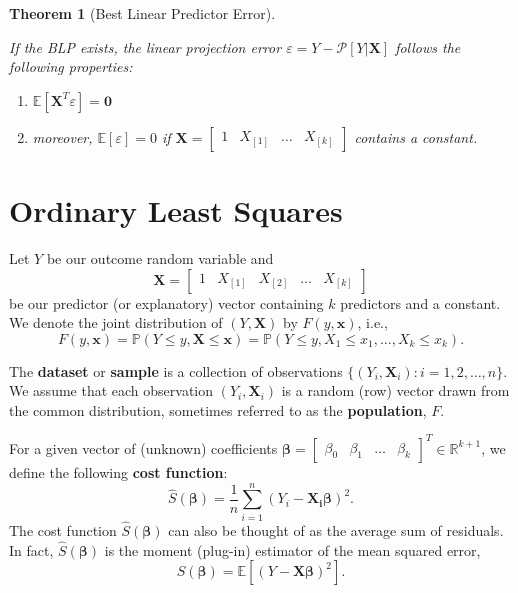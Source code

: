 \documentclass[
]{book}
\providecommand{\tightlist}{%
  \setlength{\itemsep}{0pt}\setlength{\parskip}{0pt}}
\newtheorem{theorem}{Theorem}[chapter]
\theoremstyle{definition}
\theoremstyle{definition}
\theoremstyle{definition}
\theoremstyle{definition}
\theoremstyle{remark}
\begin{document}
\begin{theorem}[Best Linear Predictor Error]
\protect\hypertarget{thm:blperror}{}\label{thm:blperror}

If the BLP exists, the linear projection error \(\varepsilon=Y-\mathscr{P}[Y|{\boldsymbol{X}}]\) follows the following properties:

\begin{enumerate}
\def\labelenumi{\arabic{enumi}.}
\tightlist
\item
  \({\mathbb{E}}[{\boldsymbol{X}}^T\varepsilon]={\boldsymbol{0}}\)
\item
  moreover, \({\mathbb{E}}[\varepsilon]=0\) if
  \({\boldsymbol{X}}=\begin{bmatrix}1 & X_{[1]} & \ldots & X_{[k]} \end{bmatrix}\) contains a constant.
\end{enumerate}

\end{theorem}

\hypertarget{ordinary-least-squares}{%
\chapter{Ordinary Least Squares}\label{ordinary-least-squares}}

Let \(Y\) be our outcome random variable and
\[
{\boldsymbol{X}}=\begin{bmatrix}
1 & X_{[1]} & X_{[2]} & \ldots & X_{[k]}
\end{bmatrix}
\]
be our predictor (or explanatory) vector containing \(k\) predictors and a constant. We denote the joint distribution of \((Y,{\boldsymbol{X}})\) by \(F(y,{\boldsymbol{x}})\), i.e.,
\[
F(y,{\boldsymbol{x}})={\mathbb{P}\left(Y\leq y, {\boldsymbol{X}}\leq{\boldsymbol{x}}\right)}
={\mathbb{P}\left(Y\leq y,X_1\leq x_1,\ldots,X_k\leq x_k\right)}.
\]

The \textbf{dataset} or \textbf{sample} is a collection of observations \(\{(Y_i,{\boldsymbol{X}}_i): i=1,2,\ldots,n\}\). We assume that each observation
\((Y_i,{\boldsymbol{X}}_i)\) is a random (row) vector drawn from the common distribution, sometimes referred to as the \textbf{population}, \(F\).

For a given vector of (unknown) coefficients
\({\boldsymbol{\beta}}=\begin{bmatrix}\beta_0 & \beta_1 & \ldots & \beta_k\end{bmatrix}^T\in\mathbb{R}^{k+1}\), we define the following \textbf{cost function}:
\[
\widehat{S}({\boldsymbol{\beta}})=\frac{1}{n}\sum\limits_{i=1}^n(Y_i-{\boldsymbol{X_i}}{\boldsymbol{\beta}})^2.
\]
The cost function \(\widehat{S}({{\boldsymbol{\beta}}})\) can also be thought of as the average sum of residuals. In fact, \(\widehat{S}({{\boldsymbol{\beta}}})\) is the moment (plug-in) estimator of the mean squared error,
\[
S({\boldsymbol{\beta}})={\mathbb{E}\left[ (Y-{\boldsymbol{X}}{\boldsymbol{\beta}})^2 \right]}.
\]
\end{document}
